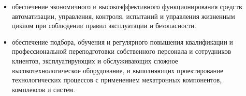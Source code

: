 \begin{enumerate}
\begin{itemize}[nosep]
    \item обеспечение экономичного и высокоэффективного функционирования средств
    автоматизации, управления, контроля, испытаний и управления жизненным циклом
    при соблюдении правил эксплуатации и безопасности.
    
    \item обеспечение подбора, обучения и регулярного повышения квалификации и
    профессиональной переподготовки собственного персонала и сотрудников
    клиентов, эксплуатирующих и обслуживающих сложное высокотехнологическое
    оборудование, и выполняющих проектирование технологических процессов с
    применением мехатронных компонентов, комплексов и систем.
     
  \end{itemize}
\end{enumerate}
